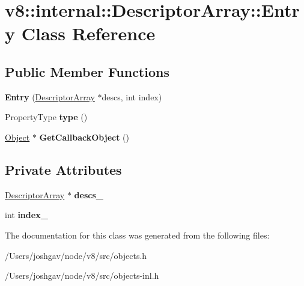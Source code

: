 \hypertarget{classv8_1_1internal_1_1_descriptor_array_1_1_entry}{}\section{v8\+:\+:internal\+:\+:Descriptor\+Array\+:\+:Entry Class Reference}
\label{classv8_1_1internal_1_1_descriptor_array_1_1_entry}
\subsection*{Public Member Functions}
\begin{DoxyCompactItemize}
\item 
{\bfseries Entry} (\hyperlink{classv8_1_1internal_1_1_descriptor_array}{Descriptor\+Array} $\ast$descs, int index)\hypertarget{classv8_1_1internal_1_1_descriptor_array_1_1_entry_a324da921e2d330f4573512de1b2e0a26}{}\label{classv8_1_1internal_1_1_descriptor_array_1_1_entry_a324da921e2d330f4573512de1b2e0a26}

\item 
Property\+Type {\bfseries type} ()\hypertarget{classv8_1_1internal_1_1_descriptor_array_1_1_entry_aad3b625bd261fc2a9b0833009bd450da}{}\label{classv8_1_1internal_1_1_descriptor_array_1_1_entry_aad3b625bd261fc2a9b0833009bd450da}

\item 
\hyperlink{classv8_1_1internal_1_1_object}{Object} $\ast$ {\bfseries Get\+Callback\+Object} ()\hypertarget{classv8_1_1internal_1_1_descriptor_array_1_1_entry_a1d108f86a02f5fca3aac981daed2a2b0}{}\label{classv8_1_1internal_1_1_descriptor_array_1_1_entry_a1d108f86a02f5fca3aac981daed2a2b0}

\end{DoxyCompactItemize}
\subsection*{Private Attributes}
\begin{DoxyCompactItemize}
\item 
\hyperlink{classv8_1_1internal_1_1_descriptor_array}{Descriptor\+Array} $\ast$ {\bfseries descs\+\_\+}\hypertarget{classv8_1_1internal_1_1_descriptor_array_1_1_entry_a8b5654bbf78363b6ac4ab565e16d6bef}{}\label{classv8_1_1internal_1_1_descriptor_array_1_1_entry_a8b5654bbf78363b6ac4ab565e16d6bef}

\item 
int {\bfseries index\+\_\+}\hypertarget{classv8_1_1internal_1_1_descriptor_array_1_1_entry_aed5f0b80ae8bd43dc500b7657c85c9c4}{}\label{classv8_1_1internal_1_1_descriptor_array_1_1_entry_aed5f0b80ae8bd43dc500b7657c85c9c4}

\end{DoxyCompactItemize}


The documentation for this class was generated from the following files\+:\begin{DoxyCompactItemize}
\item 
/\+Users/joshgav/node/v8/src/objects.\+h\item 
/\+Users/joshgav/node/v8/src/objects-\/inl.\+h\end{DoxyCompactItemize}
